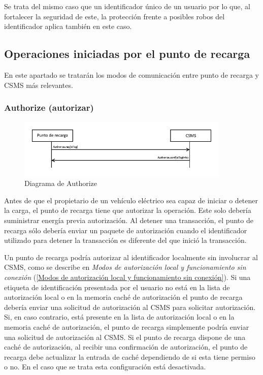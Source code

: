 \documentclass[12pt,a4paper,onecolumn,oneside]{report}
\begin{document}
Se trata del mismo caso que un identificador único de un usuario por lo que, al fortalecer la seguridad de este, la protección frente a posibles robos del identificador aplica también en este caso.



\subsection{Operaciones iniciadas por el punto de recarga}
\label{Operaciones iniciadas por el punto de recarga}

En este apartado se tratarán los modos de comunicación entre punto de recarga y CSMS más relevantes.

\subsubsection{Authorize (autorizar)}
\label{Authorize (Autorizar)}


\begin{figure}[H] 
\centering
  \includegraphics[width=0.9\textwidth]{figuras/diagramaauthorize.png}
  \caption[Diagrama de \textit{Authorize}]{Diagrama de Authorize\\
  }
  \label{fig:diagramaauthorize}
\end{figure}


Antes de que el propietario de un vehículo eléctrico sea capaz de iniciar o detener la carga, el punto de recarga tiene que autorizar la operación. Este solo debería suministrar energía previa autorización. Al detener una transacción, el punto de recarga sólo debería enviar un paquete de autorización cuando el identificador utilizado para detener la transacción es diferente del que inició la transacción.

Un punto de recarga podría autorizar al identificador localmente sin involucrar al CSMS, como se describe en \textit{Modos de autorización local y funcionamiento sin conexión} (\ref{Modos de autorización local y funcionamiento sin conexión}). Si una etiqueta de identificación presentada por el usuario no está en la lista de autorización local o en la memoria caché de autorización el punto de recarga debería enviar una solicitud de autorización al CSMS para solicitar autorización. Si, en caso contrario, está presente en la lista de autorización local o en la memoria caché de autorización, el punto de recarga simplemente podría enviar una solicitud de autorización al CSMS. Si el punto de recarga dispone de una caché de autorización, al recibir una confirmación de autorización, el punto de recarga debe actualizar la entrada de caché dependiendo de si esta tiene permiso o no. En el caso que se trata esta configuración está desactivada.
\end{document}
